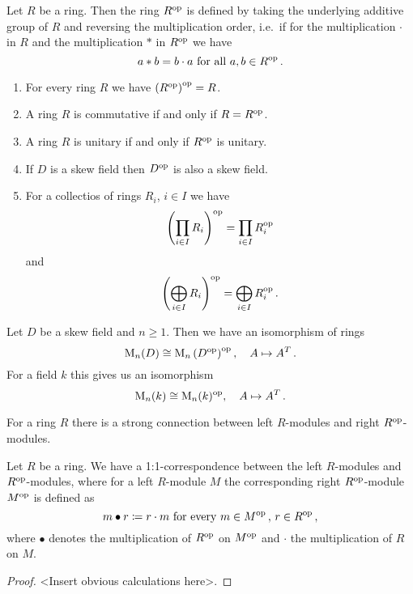 \begin{definition}
  Let $R$ be a ring. Then the ring $R^{\mathrm{op}}$ is defined by taking the underlying additive group of $R$ and reversing the multiplication order, i.e.\ if for the multiplication $\cdot$ in $R$ and the multiplication $*$ in $R^{\mathrm{op}}$ we have
  \[
      a * b
    = b \cdot a
    \text{ for all }
    a, b \in R^{\mathrm{op}} \,.
  \]
\end{definition}


\begin{remark}
  \begin{enumerate}[label=\emph{\alph*)},leftmargin=*]
    \item
      For every ring $R$ we have $\left( R^{\mathrm{op}} \right)^{\mathrm{op}} = R$.
    \item
      A ring $R$ is commutative if and only if $R = R^{\mathrm{op}}$.
    \item
      A ring $R$ is unitary if and only if $R^{\mathrm{op}}$ is unitary.
    \item
      If $D$ is a skew field then $D^{\mathrm{op}}$ is also a skew field.
    \item
      For a collectios of rings $R_i$, $i \in I$ we have
      \[
          \left( \prod_{i \in I} R_i \right)^{\mathrm{op}}
        = \prod_{i \in I} R_i^{\mathrm{op}}
      \]
      and
      \[
          \left( \bigoplus_{i \in I} R_i \right)^{\mathrm{op}}
        = \bigoplus_{i \in I} R_i^{\mathrm{op}} \,.
      \]
  \end{enumerate}
\end{remark}


\begin{example}
  Let $D$ be a skew field and $n \geq 1$.
  Then we have an isomorphism of rings
  \[
            \operatorname{M}_n(D)
    \cong   \operatorname{M}_n\left( D^{\mathrm{op}} \right)^{\mathrm{op}},
    \quad   A
    \mapsto A^T \,.
  \]
  For a field $k$ this gives us an isomorphism
  \[
            \operatorname{M}_n(k)
    \cong   \operatorname{M}_n(k)^{\mathrm{op}},
    \quad   A
    \mapsto A^T \,.
  \]
\end{example}


For a ring $R$ there is a strong connection between left $R$-modules and right $R^{\mathrm{op}}$-modules.


\begin{proposition}\label{proposition: opposite modules}
  Let $R$ be a ring.
  We have a 1:1-correspondence between the left $R$-modules and $R^{\mathrm{op}}$-modules, where for a left $R$-module $M$ the corresponding right $R^{\mathrm{op}}$-module $M^{\mathrm{op}}$ is defined as
  \[
              m \bullet r
    \coloneqq r \cdot m
    \text{ for every }
    m \in M^{\mathrm{op}} \,,\,
    r \in R^{\mathrm{op}} \,,
  \]
  where $\bullet$ denotes the multiplication of $R^{\mathrm{op}}$ on $M^{\mathrm{op}}$ and $\cdot$ the multiplication of $R$ on $M$.
\end{proposition}
\begin{proof}
  <Insert obvious calculations here>.
\end{proof}


